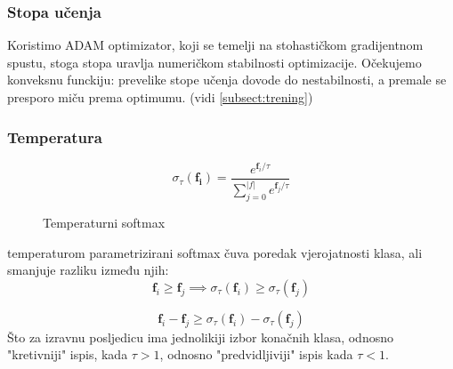 \documentclass[conference]{IEEEtran}
\begin{document}
\subsubsection{Stopa učenja}
Koristimo ADAM optimizator, koji se temelji na stohastičkom gradijentnom spustu, stoga stopa uravlja numeričkom stabilnosti optimizacije. Očekujemo konveksnu funckiju: prevelike stope učenja dovode do nestabilnosti, a premale se presporo miču prema optimumu. (vidi \ref{subsect:trening})

\subsubsection{Temperatura}
\begin{figure}[H]
\begin{equation}
\sigma_{\tau}(\mathbf{f_i}) = \frac{e^{\mathbf{f}_i/\tau}}{\sum_{j=0}^{\lvert f \rvert} e^{\mathbf{f}_j/\tau} }
\end{equation}
\caption{Temperaturni softmax}
\end{figure}


temperaturom parametrizirani softmax čuva poredak vjerojatnosti klasa, ali smanjuje razliku između njih:
\begin{equation}
\mathbf{f}_i \geq \mathbf{f}_j \implies \sigma_{\tau}(\mathbf{f}_i) \geq \sigma_{\tau}(\mathbf{f}_j)
\end{equation}

\begin{equation}
\mathbf{f}_i - \mathbf{f}_j \geq \sigma_{\tau}(\mathbf{f}_i) - 
 \sigma_{\tau}(\mathbf{f}_j)
\end{equation}
Što za izravnu posljedicu ima jednolikiji izbor konačnih klasa, odnosno "kretivniji" ispis, kada $\tau > 1$, odnosno "predvidljiviji" ispis kada $\tau < 1$.
\end{document}

